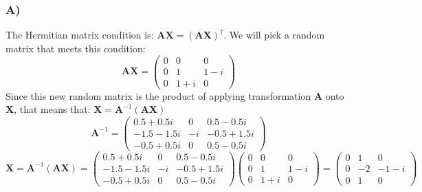 \documentclass{article}
\begin{document}
            \subsubsection*{A)}
                The Hermitian matrix condition is: $\mathbf{AX} = (\mathbf{AX})^{\dagger}$. We will pick a random matrix that meets this condition:
                \[
                    \mathbf{AX} = 
                    \begin{pmatrix}
                    0 & 0 & 0 \\
                    0 & 1 & 1 - i \\
                    0 & 1 + i & 0
                    \end{pmatrix}
                \]
                Since this new random matrix is the product of applying transformation $\mathbf{A}$ onto $\mathbf{X}$, that means that: $\mathbf{X} = \mathbf{A}^{-1}(\mathbf{AX})$
                \[
                    \mathbf{A}^{-1} = \begin{pmatrix}
                    0.5 + 0.5i & 0 & 0.5 - 0.5i \\
                    -1.5 - 1.5i & -i & -0.5 + 1.5i \\
                    -0.5 + 0.5i & 0 & 0.5 - 0.5i
                    \end{pmatrix}
                \]
                \[
                    \mathbf{X} = \mathbf{A}^{-1}(\mathbf{AX}) = \begin{pmatrix}
                    0.5 + 0.5i & 0 & 0.5 - 0.5i \\
                    -1.5 - 1.5i & -i & -0.5 + 1.5i \\
                    -0.5 + 0.5i & 0 & 0.5 - 0.5i
                    \end{pmatrix}
                    \begin{pmatrix}
                    0 & 0 & 0 \\
                    0 & 1 & 1 - i \\
                    0 & 1 + i & 0
                    \end{pmatrix}
                    = 
                    \begin{pmatrix}
                    0 & 1 & 0 \\
                    0 & -2 & -1 - i \\
                    0 & 1 & 0
                    \end{pmatrix}
                \]

                
\end{document}
